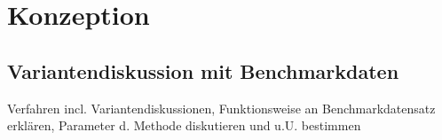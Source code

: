 \chapter{Konzeption}

\section{Variantendiskussion mit Benchmarkdaten}

Verfahren incl. Variantendiskussionen, Funktionsweise an Benchmarkdatensatz erklären, Parameter d. Methode diskutieren und u.U. bestimmen